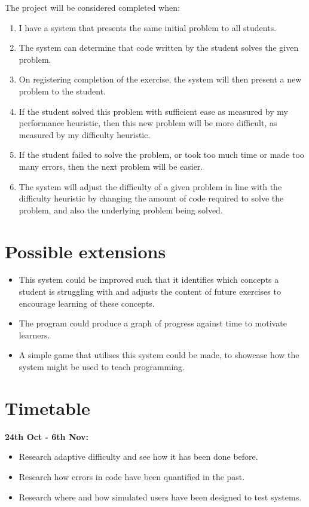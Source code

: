 \documentclass[12pt,a4paper,twoside]{article}
\begin{document}
The project will be considered completed when:
\begin{enumerate}
\item{I have a system that presents the same initial problem to all students.}
\item{The system can determine that code written by the student solves the given problem.}
\item{On registering completion of the exercise, the system will then present a new problem to the student.}
\item{If the student solved this problem with sufficient ease as measured by my performance heuristic, then this new problem will be more difficult, as measured by my difficulty heuristic.}
\item{If the student failed to solve the problem, or took too much time or made too many errors, then the next problem will be easier.}
\item{The system will adjust the difficulty of a given problem in line with the difficulty heuristic by changing the amount of code required to solve the problem, and also the underlying problem being solved.}
\end{enumerate}

\section*{Possible extensions}

\begin{itemize}
\item{This system could be improved such that it identifies which concepts a student is struggling with and adjusts the content of future exercises to encourage learning of these concepts.}
\item{The program could produce a graph of progress against time to motivate learners.}
\item{A simple game that utilises this system could be made, to showcase how the system might be used to teach programming.}
\end{itemize}

\section*{Timetable}

\textbf{24th Oct - 6th Nov:} 
\begin{itemize}
\item{Research adaptive difficulty and see how it has been done before.}
\item{Research how errors in code have been quantified in the past.}
\item{Research where and how simulated users have been designed to test systems.}
\end{itemize}
\end{document}
